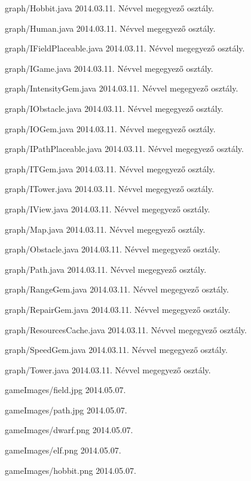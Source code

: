 \begin{fajllista}
\fajl
{graph/Hobbit.java}
{}
{2014.03.11.}
{Névvel megegyező osztály.}

\fajl
{graph/Human.java}
{}
{2014.03.11.}
{Névvel megegyező osztály.}

\fajl
{graph/IFieldPlaceable.java}
{}
{2014.03.11.}
{Névvel megegyező osztály.}

\fajl
{graph/IGame.java}
{}
{2014.03.11.}
{Névvel megegyező osztály.}

\fajl
{graph/IntensityGem.java}
{}
{2014.03.11.}
{Névvel megegyező osztály.}

\fajl
{graph/IObstacle.java}
{}
{2014.03.11.}
{Névvel megegyező osztály.}

\fajl
{graph/IOGem.java}
{}
{2014.03.11.}
{Névvel megegyező osztály.}

\fajl
{graph/IPathPlaceable.java}
{}
{2014.03.11.}
{Névvel megegyező osztály.}

\fajl
{graph/ITGem.java}
{}
{2014.03.11.}
{Névvel megegyező osztály.}

\fajl
{graph/ITower.java}
{}
{2014.03.11.}
{Névvel megegyező osztály.}

\fajl
{graph/IView.java}
{}
{2014.03.11.}
{Névvel megegyező osztály.}

\fajl
{graph/Map.java}
{}
{2014.03.11.}
{Névvel megegyező osztály.}

\fajl
{graph/Obstacle.java}
{}
{2014.03.11.}
{Névvel megegyező osztály.}

\fajl
{graph/Path.java}
{}
{2014.03.11.}
{Névvel megegyező osztály.}

\fajl
{graph/RangeGem.java}
{}
{2014.03.11.}
{Névvel megegyező osztály.}

\fajl
{graph/RepairGem.java}
{}
{2014.03.11.}
{Névvel megegyező osztály.}

\fajl
{graph/ResourcesCache.java}
{}
{2014.03.11.}
{Névvel megegyező osztály.}

\fajl
{graph/SpeedGem.java}
{}
{2014.03.11.}
{Névvel megegyező osztály.}

\fajl
{graph/Tower.java}
{}
{2014.03.11.}
{Névvel megegyező osztály.}

\fajl
{gameImages/field.jpg}
{}
{2014.05.07.}
{}

\fajl
{gameImages/path.jpg}
{}
{2014.05.07.}
{}

\fajl
{gameImages/dwarf.png}
{}
{2014.05.07.}
{}

\fajl
{gameImages/elf.png}
{}
{2014.05.07.}
{}

\fajl
{gameImages/hobbit.png}
{}
{2014.05.07.}
{}


\end{fajllista}
